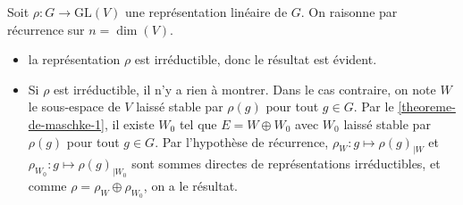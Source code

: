	\begin{demonstration}
		Soit $\rho : G \rightarrow \mathrm{GL}(V)$ une représentation linéaire de $G$. On raisonne par récurrence sur $n = \dim(V)$.
		\begin{itemize}
			\item {} la représentation $\rho$ est irréductible, donc le résultat est évident.
			\item {} Si $\rho$ est irréductible, il n'y a rien à montrer. Dans le cas contraire, on note $W$ le sous-espace de $V$ laissé stable par $\rho(g)$ pour tout $g \in G$. Par le \cref{theoreme-de-maschke-1}, il existe $W_0$ tel que $E = W \oplus W_0$ avec $W_0$ laissé stable par $\rho(g)$ pour tout $g \in G$. Par l'hypothèse de récurrence, $\rho_W : g \mapsto \rho(g)_{|W}$ et $\rho_{W_0} : g \mapsto \rho(g)_{|{W_0}}$ sont sommes directes de représentations irréductibles, et comme $\rho = \rho_W \oplus \rho_{W_0}$, on a le résultat.
		\end{itemize}
	\end{demonstration}

